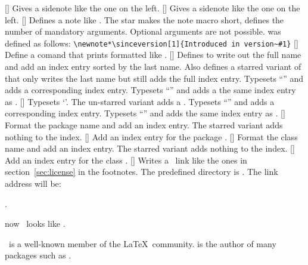 \documentclass[load-preamble]{cnltx-doc}
\begin{document}
\begin{commands}
  []
    Gives a sidenote like the one on the left.
  []
    Gives a sidenote like the one on the left.
  [\sarg{}]
    Defines a note like .  The star makes the note macro
    short,  defines the number of mandatory arguments.  Optional
    arguments are not possible.   was defined as follows:
    \lstinline[style=cnltx]+\newnote*\sinceversion[1]{Introduced in version~#1}+
  []
    Define a comand  that prints  formatted like \cnltx.
  []
    Defines  to write out the full name and add an index entry sorted
    by the last name.  Also defines a starred variant of  that only
    writes the last name but still adds the full index entry.
    Typesets ``\lppl'' and adds a corresponding index entry.
    Typesets ``\LPPL'' and adds a the same index entry as .
  [\sarg]
    Typesets `\license*'.  The un-starred variant adds a .
    Typesets ``\ctan'' and adds a corresponding index entry.
    Typesets ``\CTAN'' and adds the same index entry as .
  [\sarg{}]
    \bypackage Format the package name  and add an index entry.
    The starred variant adds nothing to the index.
  []
    \bypackage Add an index entry for the package .
  [\sarg{}]
    \bypackage Format the class name  and add an index entry.  The
    starred variant adds nothing to the index.
  []
    \bypackage Add an index entry for the class .
  []
    Writes a \ctan\ link like the ones in section~\ref{sec:license} in the
    footnotes.  The predefined directory is .  The
    link address will be:\par
    .
\end{commands}

\begin{example}
  now \foothree\ looks like \cnltx.

  \newname{}%
  \carlisle\ is a well-known member of the \LaTeX\ community.  \carlisle* is
  the author of many packages such as .
\end{example}
\end{document}
